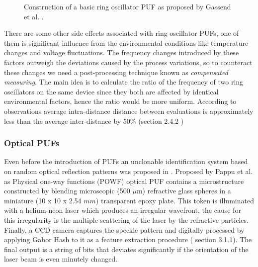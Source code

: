 \begin{figure}
\centering
{}
\caption{Construction of a basic ring oscillator PUF as proposed by Gassend et al. \cite{21,17}.}
\label{img:ring}
\end{figure}

There are some other side effects associated with ring oscillator PUFs, one of them is significant influence from the environmental conditions like temperature changes and voltage fluctuations. The frequency changes introduced by these factors outweigh the deviations caused by the process variations, so to counteract these changes we need a post-processing technique known as \emph{compensated measuring}. The main idea is to calculate the ratio of the frequency of two ring oscillators
on the same device since they both are affected by identical environmental factors, hence the ratio would be more uniform. According to observations average intra-distance distance between evaluations is approximately less than the average inter-distance by 50\% (section 2.4.2 \cite{17})

\subsubsection{Optical PUFs}

Even before the introduction of PUFs an unclonable identification system based on random optical reflection patterns was proposed in \cite{th53}. Proposed by Pappu et al. as Physical one-way functions (POWF) optical PUF contains a microstructure constructed by blending microscopic (500 $\mu$m) refractive glass spheres in a miniature (10 x 10 x 2.54 $mm$) transparent epoxy plate. This token is illuminated with a helium-neon laser which produces an irregular wavefront,
the cause for this irregularity is the multiple scattering of the laser by the refractive particles. Finally, a CCD camera captures the speckle pattern and digitally processed by applying Gabor Hash to it as a feature extraction procedure (\cite{thbook} section 3.1.1). The final output is a string of bits that deviates significantly if the orientation of the laser beam is even minutely changed.\\

